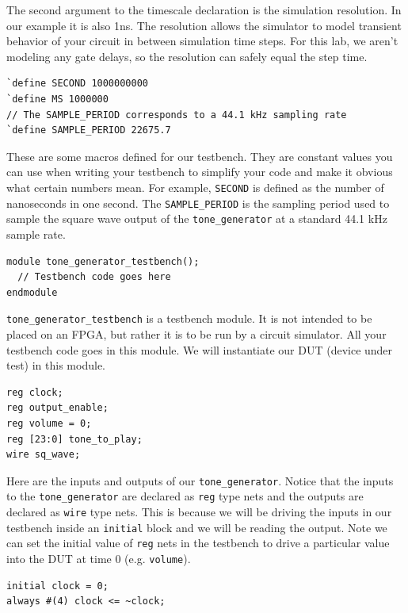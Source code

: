 \documentclass[11pt]{article}
\begin{document}
The second argument to the timescale declaration is the simulation resolution.
In our example it is also 1ns.
The resolution allows the simulator to model transient behavior of your circuit in between simulation time steps.
For this lab, we aren't modeling any gate delays, so the resolution can safely equal the step time.

\begin{verbatim}
`define SECOND 1000000000
`define MS 1000000
// The SAMPLE_PERIOD corresponds to a 44.1 kHz sampling rate
`define SAMPLE_PERIOD 22675.7
\end{verbatim}

These are some macros defined for our testbench.
They are constant values you can use when writing your testbench to simplify your code and make it obvious what certain numbers mean.
For example, \verb|SECOND| is defined as the number of nanoseconds in one second.
The \verb|SAMPLE_PERIOD| is the sampling period used to sample the square wave output of the \verb|tone_generator| at a standard 44.1 kHz sample rate.

\begin{verbatim}
module tone_generator_testbench();
  // Testbench code goes here
endmodule
\end{verbatim}

\verb|tone_generator_testbench| is a testbench module.
It is not intended to be placed on an FPGA, but rather it is to be run by a circuit simulator.
All your testbench code goes in this module.
We will instantiate our DUT (device under test) in this module.

\begin{verbatim}
reg clock;
reg output_enable;
reg volume = 0;
reg [23:0] tone_to_play;
wire sq_wave;
\end{verbatim}

Here are the inputs and outputs of our \verb|tone_generator|.
Notice that the inputs to the \verb|tone_generator| are declared as \verb|reg| type nets and the outputs are declared as \verb|wire| type nets.
This is because we will be driving the inputs in our testbench inside an \verb|initial| block and we will be reading the output.
Note we can set the initial value of \verb|reg| nets in the testbench to drive a particular value into the DUT at time 0 (e.g. \verb|volume|).

\begin{verbatim}
initial clock = 0;
always #(4) clock <= ~clock;
\end{verbatim}
\end{document}
